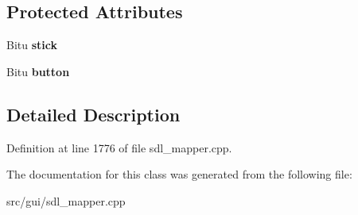 \subsection*{Protected Attributes}
\begin{DoxyCompactItemize}
\item 
\hypertarget{classCJButtonEvent_aa87062af5d8bc5db801066e2eb4a74f8}{Bitu {\bfseries stick}}\label{classCJButtonEvent_aa87062af5d8bc5db801066e2eb4a74f8}

\item 
\hypertarget{classCJButtonEvent_abdbfaa23915b89b1392129c9525dd58d}{Bitu {\bfseries button}}\label{classCJButtonEvent_abdbfaa23915b89b1392129c9525dd58d}

\end{DoxyCompactItemize}


\subsection{Detailed Description}


Definition at line 1776 of file sdl\-\_\-mapper.\-cpp.



The documentation for this class was generated from the following file\-:\begin{DoxyCompactItemize}
\item 
src/gui/sdl\-\_\-mapper.\-cpp\end{DoxyCompactItemize}
